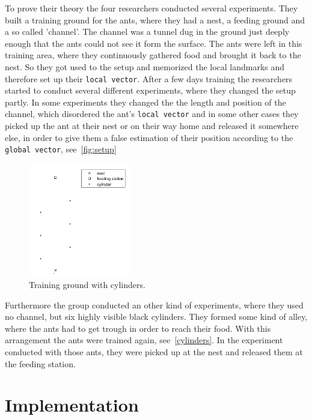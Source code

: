 \documentclass[11pt]{article}
\begin{document}
		To prove their theory the four researchers conducted several experiments. They built a training ground for the ants, where they had a nest, a feeding ground and a so called 'channel'. The channel was a tunnel dug in the ground just deeply enough that the ants could not see it form the surface. The ants were left in this training area, where they continuously gathered food and brought it back to the nest. So they got used to the setup and memorized the local landmarks and therefore set up their \texttt{local vector}. After a few days training the researchers started to conduct several different experiments, where they changed the setup partly. In some experiments they changed the the length and position of the channel, which disordered the ant's \texttt{local vector} and in some other cases they picked up the ant at their nest or on their way home and released it somewhere else, in order to give them a false estimation of their position according to the \texttt{global vector}, see~\vref{fig:setup}


\begin{figure}
	\includegraphics[width=0.4\textwidth]{cylinders.png}
	\caption{Training ground with cylinders.}
	\label{fig:cylinders}
\end{figure}


	Furthermore the group conducted an other kind of experiments, where they used no channel, but six highly visible black cylinders. They formed some kind of alley, where the ants had to get trough in order to reach their food. With this arrangement the ants were trained again, see~\vref{cylinders}. In the experiment conducted with those ants, they were picked up at the nest and released them at the feeding station.
		



\section{Implementation} %
\end{document}
